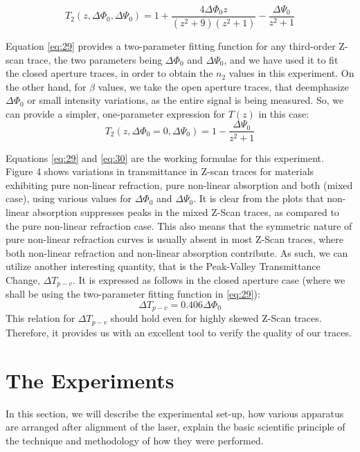 \documentclass[%
 reprint,
 amsmath,amssymb,
 aps,
]{revtex4-2}
\begin{document}
		\begin{equation}\label{eq:29}
			T_2(z, \Delta \Phi_0, \Delta \Psi_0) = 1 + \dfrac{4 \Delta \Phi_0 z}{(z^2+9)(z^2+1)} - \dfrac{\Delta \Psi_0}{z^2+1}
		\end{equation}
		\par 
		Equation \eqref{eq:29} provides a two-parameter fitting function for any third-order Z-
		scan trace, the two parameters being $ \Delta \Phi_0 $ and $ \Delta \Psi_0 $, and we have used it
		to fit the closed aperture traces, in order to obtain the $ n_2 $ values in this
		experiment. On the other hand, for $ \beta $ values, we take the open aperture
		traces, that deemphasize $ \Delta \Phi_0 $ or small intensity variations, as the entire
		signal is being measured.
		So, we can provide a simpler, one-parameter
		expression for $ T(z) $ in this case:
		\begin{equation}\label{eq:30}
			T_2(z, \Delta \Phi_0=0, \Delta \Psi_0) = 1 - \dfrac{\Delta \Psi_0}{z^2+1}
		\end{equation}
		\par 
		Equations \eqref{eq:29} and \eqref{eq:30} are the working formulae for this experiment. Figure 4
		shows variations in transmittance in Z-scan traces for materials exhibiting
		pure non-linear refraction, pure non-linear absorption and both (mixed case), using various
		values for $ \Delta \Phi_0 $ and $ \Delta \Psi_0 $. It is clear from the plots that non-linear absorption suppresses
		peaks in the mixed Z-Scan traces, as compared to the pure non-linear refraction case. This
		also means that the symmetric nature of pure non-linear refraction curves is usually absent
		in most Z-Scan traces, where both non-linear refraction and non-linear absorption contribute. As such, we
		can utilize another interesting quantity, that is the Peak-Valley Transmittance Change, $ \Delta T_{p-v} $. It is expressed as follows in the closed aperture case
		(where we shall be using the two-parameter fitting function in \eqref{eq:29}):
		\begin{equation}\label{key}
			\Delta T_{p-v} = 0.406 \Delta \Phi_0
		\end{equation}
		This relation for $ \Delta T_{p-v} $ should hold even for highly skewed Z-Scan traces.
		Therefore, it provides us with an excellent tool to verify the quality of our
		traces.
		
		
		
		
\section{The Experiments}
	In this section, we will describe the experimental set-up, how various apparatus are arranged after alignment of the laser, explain the basic scientific principle of the technique and methodology of how they were performed.
\end{document}
